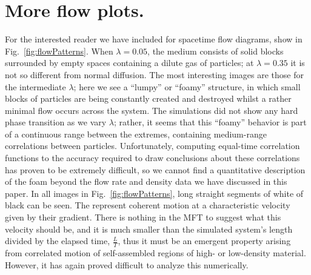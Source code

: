 \documentclass[
reprint, amsmath,amssymb, aps,
 pre, longbibliography,
]{revtex4-1}
\begin{document}
\section{More flow plots.} For the interested reader we have included for spacetime flow diagrams, show in Fig.~\ref{fig:flowPatterns}. When $\lambda=0.05$, the medium consists of solid blocks surrounded by empty spaces containing a dilute
gas of particles; at $\lambda=0.35$ it is not so different from normal diffusion.
The most interesting images are those for the intermediate $\lambda$; here we see a ``lumpy'' or ``foamy'' structure, in which small blocks
of particles are being constantly created and destroyed whilst a rather minimal flow occurs across the system.
The simulations did not show any hard phase transition as we vary $\lambda$; rather, it seems that this ``foamy''
behavior is part of a continuous range between the extremes, containing medium-range correlations between particles.
Unfortunately, computing equal-time correlation functions to the accuracy required
to draw conclusions about these correlations has proven to be extremely difficult, so we cannot find a quantitative description of the foam beyond the flow rate and density data we have discussed in this paper.
In all images in Fig.~\ref{fig:flowPatterns}, long straight segments of white of black can be seen.  The represent coherent motion at a characteristic velocity given by their gradient. There is nothing in the MFT to suggest what this velocity
should be, and it is much smaller than the simulated system's length divided by the elapsed time,  $\frac{L}{T}$, thus it must be an emergent property arising from correlated motion of self-assembled regions of  high- or low-density material.
However, it has again proved difficult to analyze this numerically.
\end{document}
